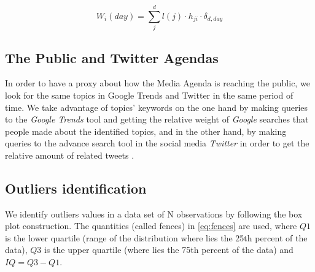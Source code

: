 \documentclass[a4paper, 12pt]{article}
\begin{document}
\begin{equation}
W_i(day) = \sum_j^d l(j) \cdot h_{ji} \cdot \delta_{d,day}
\label{eq:topic_weight}
\end{equation}


\subsection{The Public and Twitter Agendas}
 
\par In order to have a proxy about how the Media Agenda is reaching the public, we look for the same topics in Google Trends and Twitter in the same period of time. We take advantage of topics' keywords on the one hand by making queries to the \emph{Google Trends} tool and getting the relative weight of \emph{Google} searches that people made about the identified topics, and in the other hand, by making queries to the advance search tool in the social media \emph{Twitter} in order to get the relative amount of related tweets . 




\subsection{Outliers identification}
\label{sec:outliers_identification}

\par We identify outliers values in a data set of N observations by following the box plot construction. The quantities (called fences) in \ref{eq:fences} are used, where $Q1$ is the lower quartile (range of the distribution where lies the 25th percent of the data), $Q3$ is the upper quartile (where lies the 75th percent of the data) and $IQ = Q3 - Q1$.
\end{document}
